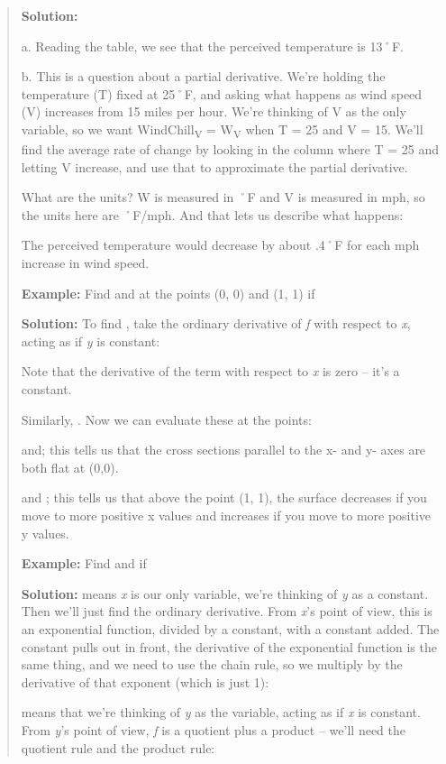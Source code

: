 \begin{quote}
\textbf{Solution:}

a. Reading the table, we see that the perceived temperature is 13˚F.

b. This is a question about a partial derivative. We're holding the
temperature (T) fixed at 25˚F, and asking what happens as wind speed (V)
increases from 15 miles per hour. We're thinking of V as the only
variable, so we want WindChill\textsubscript{V} = W\textsubscript{V}
when T = 25 and V = 15. We'll find the average rate of change by looking
in the column where T = 25 and letting V increase, and use that to
approximate the partial derivative.

What are the units? W is measured in ˚F and V is measured in mph, so the
units here are ˚F/mph. And that lets us describe what happens:

The perceived temperature would decrease by about .4˚F for each mph
increase in wind speed.

\textbf{Example:} Find and at the points (0, 0) and (1, 1) if

\textbf{Solution:} To find , take the ordinary derivative of \emph{f}
with respect to \emph{x}, acting as if \emph{y} is constant:

Note that the derivative of the term with respect to \emph{x} is zero --
it's a constant.

Similarly, . Now we can evaluate these at the points:

and; this tells us that the cross sections parallel to the x- and y-
axes are both flat at (0,0).

and ; this tells us that above the point (1, 1), the surface decreases
if you move to more positive x values and increases if you move to more
positive y values.

\textbf{Example:} Find and if

\textbf{Solution:} means \emph{x} is our only variable, we're thinking
of \emph{y} as a constant. Then we'll just find the ordinary derivative.
From \emph{x}'s point of view, this is an exponential function, divided
by a constant, with a constant added. The constant pulls out in front,
the derivative of the exponential function is the same thing, and we
need to use the chain rule, so we multiply by the derivative of that
exponent (which is just 1):

means that we're thinking of \emph{y} as the variable, acting as if
\emph{x} is constant. From \emph{y}'s point of view, \emph{f} is a
quotient plus a product -- we'll need the quotient rule and the product
rule:
\end{quote}

